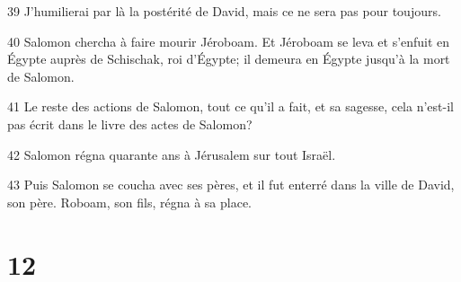 \par 39 J'humilierai par là la postérité de David, mais ce ne sera pas pour toujours.
\par 40 Salomon chercha à faire mourir Jéroboam. Et Jéroboam se leva et s'enfuit en Égypte auprès de Schischak, roi d'Égypte; il demeura en Égypte jusqu'à la mort de Salomon.
\par 41 Le reste des actions de Salomon, tout ce qu'il a fait, et sa sagesse, cela n'est-il pas écrit dans le livre des actes de Salomon?
\par 42 Salomon régna quarante ans à Jérusalem sur tout Israël.
\par 43 Puis Salomon se coucha avec ses pères, et il fut enterré dans la ville de David, son père. Roboam, son fils, régna à sa place.

\chapter{12}

